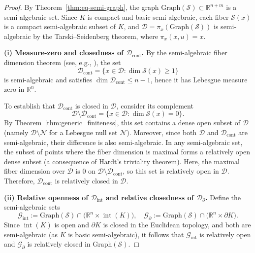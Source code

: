 \documentclass[sn-basic,Numbered]{sn-jnl}
\theoremstyle{thmstyleone}%
\begin{document}
\begin{proof}
By Theorem~\ref{thm:eq-semi-graph}, the graph $\mathrm{Graph}(\mathcal{S}) \subset \mathbb{R}^{n+m}$ is a semi-algebraic set. Since $K$ is compact and basic semi-algebraic, each fiber $\mathcal{S}(x)$ is a compact semi-algebraic subset of $K$, and $\mathcal{D} = \pi_x(\mathrm{Graph}(\mathcal{S}))$ is semi-algebraic by the Tarski--Seidenberg theorem, where $\pi_x(x,u) = x$.

\smallskip
\noindent\textbf{(i) Measure-zero and closedness of $\mathcal{D}_{\mathrm{cont}}$.}
By the semi-algebraic fiber dimension theorem (see, e.g., \cite[Theorem~3.18]{Coste2002}), the set
\[
\mathcal{D}_{\mathrm{cont}} = \{ x \in \mathcal{D} : \dim \mathcal{S}(x) \ge 1 \}
\]
is semi-algebraic and satisfies $\dim \mathcal{D}_{\mathrm{cont}} \le n - 1$, hence it has Lebesgue measure zero in $\mathbb{R}^n$.

To establish that $\mathcal{D}_{\mathrm{cont}}$ is closed in $\mathcal{D}$, consider its complement
\[
\mathcal{D} \setminus \mathcal{D}_{\mathrm{cont}} = \{ x \in \mathcal{D} : \dim \mathcal{S}(x) = 0 \}.
\]
By Theorem~\ref{thm:generic_finiteness}, this set contains a dense open subset of $\mathcal{D}$ (namely $\mathcal{D} \setminus \mathcal{N}$ for a Lebesgue null set $\mathcal{N}$). Moreover, since both $\mathcal{D}$ and $\mathcal{D}_{\mathrm{cont}}$ are semi-algebraic, their difference is also semi-algebraic. In any semi-algebraic set, the subset of points where the fiber dimension is maximal forms a relatively open dense subset (a consequence of Hardt’s triviality theorem). Here, the maximal fiber dimension over $\mathcal{D}$ is $0$ on $\mathcal{D} \setminus \mathcal{D}_{\mathrm{cont}}$, so this set is relatively open in $\mathcal{D}$. Therefore, $\mathcal{D}_{\mathrm{cont}}$ is relatively closed in $\mathcal{D}$.

\smallskip
\noindent\textbf{(ii) Relative openness of $\mathcal{D}_{\mathrm{int}}$ and relative closedness of $\mathcal{D}_{\partial}$.}
Define the semi-algebraic sets
\[
\mathcal{G}_{\mathrm{int}} := \mathrm{Graph}(\mathcal{S}) \cap \bigl( \mathbb{R}^n \times \operatorname{int}(K) \bigr), \quad
\mathcal{G}_{\partial} := \mathrm{Graph}(\mathcal{S}) \cap \bigl( \mathbb{R}^n \times \partial K \bigr).
\]
Since $\operatorname{int}(K)$ is open and $\partial K$ is closed in the Euclidean topology, and both are semi-algebraic (as $K$ is basic semi-algebraic), it follows that $\mathcal{G}_{\mathrm{int}}$ is relatively open and $\mathcal{G}_{\partial}$ is relatively closed in $\mathrm{Graph}(\mathcal{S})$.


\end{proof}
\end{document}
